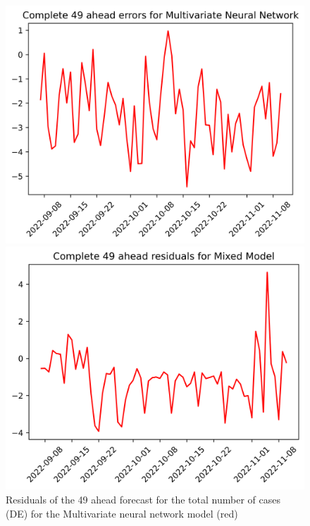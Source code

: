 \begin{figure}

\begin{minipage}{.32\textwidth}
  \centering
  \includegraphics[width=\linewidth]{pics/49_ah/DE_49_ahead_errors_Multivariate Neural Network.png}
  \caption{Residuals of the 49 ahead forecast for the total number of cases (DE) for the Multivariate neural network model (red)}
  \label{fig:tot_cases_error_49_mvnn_DE}
\end{minipage}
\begin{minipage}{.32\textwidth}
  \centering
  \includegraphics[width=\linewidth]{pics/49_ah/49_ahead_errors_Mixed Model.png}

\end{minipage}
\end{figure}
